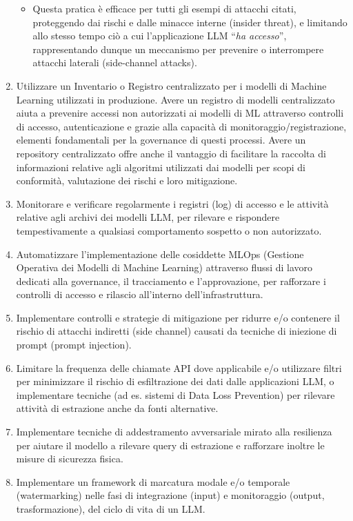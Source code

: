 \documentclass[
]{article}
\providecommand{\tightlist}{%
  \setlength{\itemsep}{0pt}\setlength{\parskip}{0pt}}
\begin{document}
\begin{enumerate}
  \begin{itemize}
  \tightlist
  \item
    Questa pratica è efficace per tutti gli esempi di attacchi citati,
    proteggendo dai rischi e dalle minacce interne (insider threat), e
    limitando allo stesso tempo ciò a cui l'applicazione LLM ``\emph{ha
    accesso}'', rappresentando dunque un meccanismo per prevenire o
    interrompere attacchi laterali (side-channel attacks).
  \end{itemize}
\item
  Utilizzare un Inventario o Registro centralizzato per i modelli di
  Machine Learning utilizzati in produzione. Avere un registro di
  modelli centralizzato aiuta a prevenire accessi non autorizzati ai
  modelli di ML attraverso controlli di accesso, autenticazione e grazie
  alla capacità di monitoraggio/registrazione, elementi fondamentali per
  la governance di questi processi. Avere un repository centralizzato
  offre anche il vantaggio di facilitare la raccolta di informazioni
  relative agli algoritmi utilizzati dai modelli per scopi di
  conformità, valutazione dei rischi e loro mitigazione.
\item
  Monitorare e verificare regolarmente i registri (log) di accesso e le
  attività relative agli archivi dei modelli LLM, per rilevare e
  rispondere tempestivamente a qualsiasi comportamento sospetto o non
  autorizzato.
\item
  Automatizzare l'implementazione delle cosiddette MLOps (Gestione
  Operativa dei Modelli di Machine Learning) attraverso flussi di lavoro
  dedicati alla governance, il tracciamento e l'approvazione, per
  rafforzare i controlli di accesso e rilascio all'interno
  dell'infrastruttura.
\item
  Implementare controlli e strategie di mitigazione per ridurre e/o
  contenere il rischio di attacchi indiretti (side channel) causati da
  tecniche di iniezione di prompt (prompt injection).
\item
  Limitare la frequenza delle chiamate API dove applicabile e/o
  utilizzare filtri per minimizzare il rischio di esfiltrazione dei dati
  dalle applicazioni LLM, o implementare tecniche (ad es. sistemi di
  Data Loss Prevention) per rilevare attività di estrazione anche da
  fonti alternative.
\item
  Implementare tecniche di addestramento avversariale mirato alla
  resilienza per aiutare il modello a rilevare query di estrazione e
  rafforzare inoltre le misure di sicurezza fisica.
\item
  Implementare un framework di marcatura modale e/o temporale
  (watermarking) nelle fasi di integrazione (input) e monitoraggio
  (output, trasformazione), del ciclo di vita di un LLM.
\end{enumerate}
\end{document}
